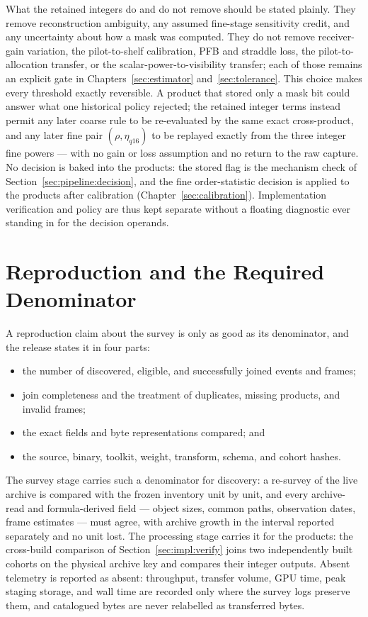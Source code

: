 What the retained integers do and do not remove should be stated plainly.
They remove reconstruction ambiguity, any assumed fine-stage sensitivity
credit, and any uncertainty about how a mask was computed.  They do not remove
receiver-gain variation, the pilot-to-shelf calibration, PFB and straddle loss,
the pilot-to-allocation transfer, or the scalar-power-to-visibility transfer;
each of those remains an explicit gate in Chapters~\ref{sec:estimator}
and~\ref{sec:tolerance}.  This choice makes every threshold exactly reversible.  A product that stored
only a mask bit could answer what one historical policy rejected; the retained
integer terms instead permit any later coarse rule to be re-evaluated by the
same exact cross-product, and any later fine pair $(\rho,\eta_{q16})$ to be
replayed exactly from the three integer fine powers --- with no gain or loss
assumption and no return to the raw capture.  No decision is baked into the products: the stored flag is the mechanism
check of Section~\ref{sec:pipeline:decision}, and the fine order-statistic
decision is applied to the products after calibration (Chapter~\ref{sec:calibration}).  Implementation verification and policy are thus
kept separate without a floating diagnostic ever standing in for the decision
operands.

\section{Reproduction and the Required Denominator}
\label{sec:survey:reproduction}

A reproduction claim about the survey is only as good as its denominator, and
the release states it in four parts:
\begin{itemize}
\item the number of discovered, eligible, and successfully joined events and frames;
\item join completeness and the treatment of duplicates, missing products, and invalid frames;
\item the exact fields and byte representations compared; and
\item the source, binary, toolkit, weight, transform, schema, and cohort hashes.
\end{itemize}
The survey stage carries such a denominator for discovery: a re-survey of the
live archive is compared with the frozen inventory unit by unit, and every
archive-read and formula-derived field --- object sizes, common paths,
observation dates, frame estimates --- must agree, with archive growth in the
interval reported separately and no unit lost.  The processing stage carries it
for the products: the cross-build comparison of Section~\ref{sec:impl:verify}
joins two independently built cohorts on the physical archive key and compares
their integer outputs.  Absent telemetry is reported as absent: throughput,
transfer volume, GPU time, peak staging storage, and wall time are recorded only
where the survey logs preserve them, and catalogued bytes are never relabelled
as transferred bytes.

